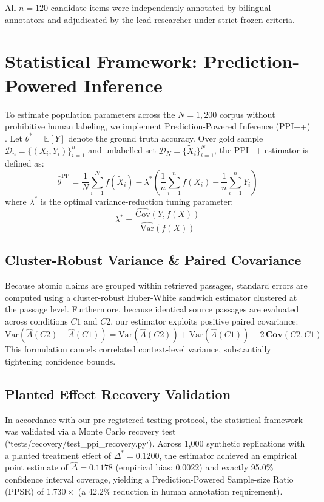 \documentclass[conference]{IEEEtran}
\begin{document}
All $n=120$ candidate items were independently annotated by bilingual annotators and adjudicated by the lead researcher under strict frozen criteria.

\section{Statistical Framework: Prediction-Powered Inference}
\label{sec:stats}
To estimate population parameters across the $N=1,200$ corpus without prohibitive human labeling, we implement Prediction-Powered Inference (PPI++) \cite{angelopoulos2023ppi, gao2026ppsr}. Let $\theta^* = \mathbb{E}[Y]$ denote the ground truth accuracy. Over gold sample $\mathcal{D}_n = \{(X_i, Y_i)\}_{i=1}^n$ and unlabelled set $\mathcal{D}_N = \{\tilde{X}_i\}_{i=1}^N$, the PPI++ estimator is defined as:
\begin{equation}
    \hat{\theta}^{\text{PP}} = \frac{1}{N}\sum_{i=1}^N f(\tilde{X}_i) - \lambda^* \left( \frac{1}{n}\sum_{i=1}^n f(X_i) - \frac{1}{n}\sum_{i=1}^n Y_i \right)
\end{equation}
where $\lambda^*$ is the optimal variance-reduction tuning parameter:
\begin{equation}
    \lambda^* = \frac{\widehat{\text{Cov}}(Y, f(X))}{\widehat{\text{Var}}(f(X))}
\end{equation}

\subsection{Cluster-Robust Variance \& Paired Covariance}
Because atomic claims are grouped within retrieved passages, standard errors are computed using a cluster-robust Huber-White sandwich estimator clustered at the passage level. Furthermore, because identical source passages are evaluated across conditions $C1$ and $C2$, our estimator exploits positive paired covariance:
\begin{equation}
    \text{Var}(\hat{A}(C2) - \hat{A}(C1)) = \text{Var}(\hat{A}(C2)) + \text{Var}(\hat{A}(C1)) - 2\,\mathbf{Cov}(C2, C1)
\end{equation}
This formulation cancels correlated context-level variance, substantially tightening confidence bounds.

\subsection{Planted Effect Recovery Validation}
In accordance with our pre-registered testing protocol, the statistical framework was validated via a Monte Carlo recovery test (`tests/recovery/test_ppi_recovery.py`). Across 1,000 synthetic replications with a planted treatment effect of $\Delta^* = 0.1200$, the estimator achieved an empirical point estimate of $\hat{\Delta} = 0.1178$ (empirical bias: $0.0022$) and exactly 95.0\% confidence interval coverage, yielding a Prediction-Powered Sample-size Ratio (PPSR) of $1.730\times$ (a 42.2\% reduction in human annotation requirement).
\end{document}
